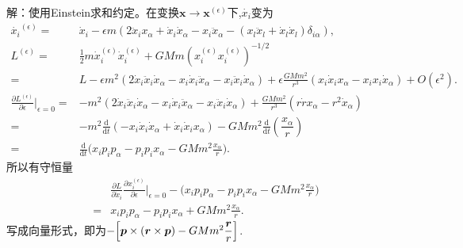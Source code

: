 \begin{enumerate}
    解：使用Einstein求和约定。在变换$\boldsymbol{x} \rightarrow \boldsymbol{x}^{(\epsilon)}$下,$\dot{x_i}$变为
    \begin{align*}
        \dot{x_i}^{(\epsilon)}=&\dot{x}_i-\epsilon m(2\ddot{x}_ix_{\alpha}+\dot{x}_i\dot{x}_{\alpha}-
        x_i\ddot{x}_{\alpha}-(x_l\ddot{x}_l+\dot{x}_l\dot{x}_l)\delta_{i\alpha}),\\
        L^{(\epsilon)}=&\frac{1}{2}m\dot{x}_i^{(\epsilon)}\dot{x}_i^{(\epsilon)}+GMm(x_i^{(\epsilon)}x_i^{(\epsilon)})^{-1/2}\\
        =&L-\epsilon m^2(2\dot{x}_i\ddot{x}_i\dot{x}_{\alpha}-x_i\dot{x}_i\ddot{x}_{\alpha}-x_i\ddot{x}_i\dot{x}_{\alpha})+
        \epsilon\frac{GMm^2}{r^3}(x_i\dot{x}_ix_{\alpha}-x_ix_i\dot{x}_{\alpha})+O(\epsilon^2).\\
        \frac{\partial L^{(\epsilon)}}{\partial \epsilon}\Big|_{\epsilon=0}=&-m^2(2\dot{x}_i\ddot{x}_i\dot{x}_{\alpha}
        -x_i\dot{x}_i\ddot{x}_{\alpha}-x_i\ddot{x}_i\dot{x}_{\alpha})+\frac{GMm^2}{r^3}(r\dot{r}x_{\alpha}-r^2\dot{x}_{\alpha})\\
        =&-m^2\frac{\text{d}}{\text{d}t}(-x_i\dot{x}_i\dot{x}_{\alpha}+\dot{x}_i\dot{x}_ix_{\alpha})-GMm^2\frac{\text{d}}{\text{d}t}(\dfrac{x_{\alpha}}{r})\\
        =&\frac{\text{d}}{\text{d}t}\Big(x_ip_ip_{\alpha}-p_ip_ix_{\alpha}-GMm^2\frac{x_{\alpha}}{r}\Big).
    \end{align*}
    所以有守恒量
    \begin{align*}
        &\frac{\partial L}{\partial \dot{x}_i}\frac{\partial x_i^{(\epsilon)}}{\partial \epsilon}\Big|_{\epsilon=0}-
        \Big(x_ip_ip_{\alpha}-p_ip_ix_{\alpha}-GMm^2\frac{x_{\alpha}}{r}\Big)\\
        =&x_ip_ip_{\alpha}-p_ip_ix_{\alpha}+GMm^2\frac{x_{\alpha}}{r}.
    \end{align*}
    写成向量形式，即为$-\Big[\boldsymbol{p} \times (\boldsymbol{r} \times \boldsymbol{p})-GMm^2\dfrac{\boldsymbol{r}}{r}\Big]$.
\end{enumerate}



